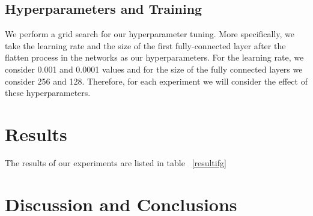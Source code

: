 \documentclass{article} %
\begin{document}
\subsection{Hyperparameters and Training}
We perform a grid search for our hyperparameter tuning. More specifically, we take the learning rate and the size of the first fully-connected layer after the flatten process in the networks as our hyperparameters. For the learning rate, we consider 0.001 and 0.0001 values and for the size of the fully connected layers we consider 256 and 128. Therefore, for each experiment we will consider the effect of these hyperparameters.
\section{Results}
The results of our experiments are listed in table ~\ref{resultifg}

\section{Discussion and Conclusions}
%
%
%
%
%
%
%
\printbibliography
\end{document}

